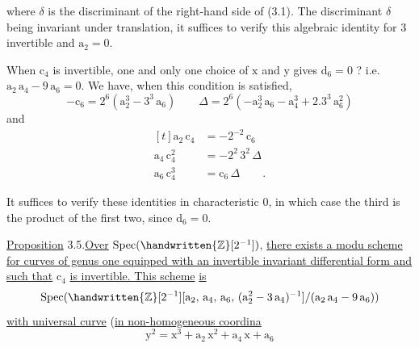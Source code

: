 where $\delta$ is the discriminant of the right-hand side of (3.1). The discriminant $\delta$ being invariant under translation, it suffices to verify this algebraic identity for $3$ invertible and $\mathrm{a}_{2}=0$.

When $\mathrm{c}_{4}$ is invertible, one and only one choice of $\mathrm{x}$ and $\mathrm{y}$ gives $\mathrm{d}_{6}=0$ ? i.e. $\mathrm{a}_{2}\,\mathrm{a}_{4}-9\,\mathrm{a}_{6}=0$. We have, when this condition is satisfied,
\[
-\mathrm{c}_{6}=2^{6}(\mathrm{a}_{2}^{3}-3^{3}\,\mathrm{a}_{6})\qquad
\Delta=2^{6}(-\mathrm{a}_{2}^{3}\,\mathrm{a}_{6}-\mathrm{a}_{4}^{3}+2.3^{3}\,\mathrm{a}_{6}^{2})
\tag*{(3.3)}
\]
and
\[
\begin{aligned}[t]
\mathrm{a}_{2}\,\mathrm{c}_{4}&=-2^{-2}\,\mathrm{c}_{6}\\
\mathrm{a}_{4}\,\mathrm{c}_{4}^{2}&=-2^{2}\,3^{2}\,\Delta\\
\mathrm{a}_{6}\,\mathrm{c}_{4}^{3}&=\mathrm{c}_{6}\,\Delta\qquad.
\end{aligned}
\tag*{(3.4)}
\]

It suffices to verify these identities in characteristic $0$, in which case the third is the product of the first two, since $\mathrm{d}_{6}=0$.

\uline{Proposition} 3.5.\quad \uline{Over} $\operatorname{Spec}(\handwritten{\mathbb{Z}}[2^{-1}])$, \uline{there exists a modu}\uline{ scheme for curves of genus one equipped with an invertible invariant differential form and such that} $\mathrm{c}_{4}$ \uline{is invertible. This scheme} \reversemarginpar{}\normalmarginpar\uline{is}
\[
\operatorname{Spec}(\handwritten{\mathbb{Z}}[2^{-1}][\mathrm{a}_{2},\,\mathrm{a}_{4},\,\mathrm{a}_{6},\,(\mathrm{a}_{2}^{2}-3\,\mathrm{a}_{4})^{-1}]/(\mathrm{a}_{2}\,\mathrm{a}_{4}-9\,\mathrm{a}_{6}))
\]
\uline{with universal curve} (\uline{in non-homogeneous coordina}
\[
\mathrm{y}^{2}=\mathrm{x}^{3}+\mathrm{a}_{2}\,\mathrm{x}^{2}+\mathrm{a}_{4}\,\mathrm{x}+\mathrm{a}_{6}
\]
\clearpage
